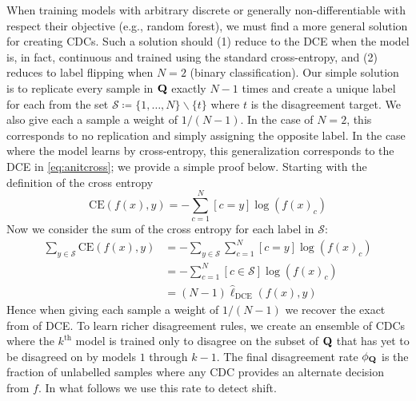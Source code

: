      When training models with arbitrary discrete or generally non-differentiable with respect their objective (e.g., random forest), we must find a more general solution for creating CDCs.
Such a solution should (1) reduce to the DCE when the model is, in fact, continuous and trained using the standard cross-entropy, and (2) reduces to label flipping when $N=2$ (binary classification).
Our simple solution is to replicate every sample in $\mathbf{Q}$ exactly $N-1$ times and create a unique label for each
from the set $\mathcal{S}\coloneqq \{1,\dots,N\}\backslash \{t\}$ where $t$ is the disagreement target.
We also give each a sample a weight of $1/(N-1)$.
In the case of $N=2$, this corresponds to no replication and simply assigning the opposite label.
In the case where the model learns by cross-entropy, this generalization corresponds to the DCE in \autoref{eq:anitcross}; we provide a simple proof below.
\smallbreak\noindent
Starting with the definition of the cross entropy
\begin{equation}
    \text{CE}(f(x), y) = -\sum_{c=1}^N [{c=y}] \log(f(x)_c)
\end{equation}
Now we consider the sum of the cross entropy for each label in $\mathcal{S}$:
\begin{align}
    \sum_{y\in \mathcal{S}} \text{CE}(f(x), y) &= -\sum_{y\in \mathcal{S}} \sum_{c=1}^{N}[{c=y}]\log(f(x)_c) \\
    &=-\sum_{c=1}^{N}[{c\in \mathcal{S}}]\log(f(x)_c)\\
    &= (N-1) \hat{\ell}_\text{DCE}(f(x), y)
\end{align}
Hence when giving each sample a weight of $1/(N-1)$ we recover the exact from of DCE.
\smallbreak
{} To learn richer disagreement rules, we create an
ensemble of CDCs where the $k^{\text{th}}$ model is trained only to disagree on the subset of
$\mathbf{Q}$ that has yet to be disagreed on by models $1$ through $k-1$.
The final disagreement rate $\phi_{\mathbf{Q}}$ is the fraction of unlabelled samples where any CDC provides an alternate decision from $f$.
In what follows we use this rate to detect shift.

